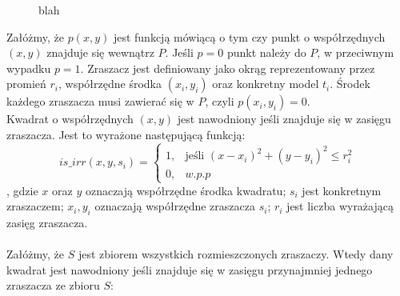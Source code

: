 \documentclass[twoside]{iisthesis}
\begin{document}
\begin{figure}[!htb]
	\centering
	\caption{blah}
	\label{fig:matrix_m}
\end{figure}
Załóżmy, że $p(x,y)$ jest funkcją mówiącą o tym czy punkt o współrzędnych $(x, y)$ znajduje się wewnątrz $P$. Jeśli $p = 0$ punkt należy do $P$, w przeciwnym wypadku $p=1$. Zraszacz jest definiowany jako okrąg reprezentowany przez promień $r_{i}$, współrzędne środka $(x_i, y_i)$ oraz konkretny model $t_{i}$. Środek każdego zraszacza musi zawierać się w $P$, czyli $p(x_{i}, y_{i}) = 0$.\\
Kwadrat o współrzędnych $(x,y)$ jest nawodniony jeśli znajduje się w zasięgu zraszacza. Jest to wyrażone następującą funkcją:
\begin{equation}
	is\_irr(x, y, s_{i}) = \begin{cases}
							1,& \text{jeśli } (x - x_{i})^{2} + (y - y_{i})^2 \leq r_{i}^{2}\\
							0,& w.p.p
						  \end{cases}
\end{equation}
, gdzie $x$ oraz $y$ oznaczają współrzędne środka kwadratu; $s_{i}$ jest konkretnym zraszaczem; $x_{i}, y_{i}$ oznaczają współrzędne zraszacza $s_{i}$; $r_{i}$ jest liczba wyrażającą zasięg zraszacza.\\\\
Załóżmy, że $S$ jest zbiorem wszystkich rozmieszczonych zraszaczy. Wtedy dany kwadrat jest nawodniony jeśli znajduje się w zasięgu przynajmniej jednego zraszacza ze zbioru $S$:
\end{document}
